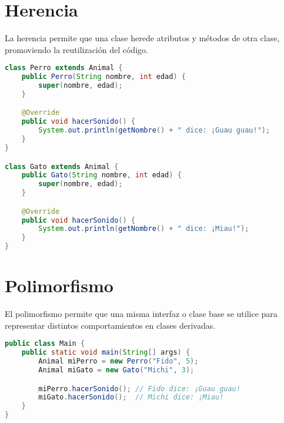 \documentclass[12pt]{article}
\begin{document}
\section{Herencia}
La herencia permite que una clase herede atributos y métodos de otra clase, promoviendo la reutilización del código.

\begin{lstlisting}[language=Java, caption={Ejemplo de herencia}]
class Perro extends Animal {
    public Perro(String nombre, int edad) {
        super(nombre, edad);
    }

    @Override
    public void hacerSonido() {
        System.out.println(getNombre() + " dice: ¡Guau guau!");
    }
}

class Gato extends Animal {
    public Gato(String nombre, int edad) {
        super(nombre, edad);
    }

    @Override
    public void hacerSonido() {
        System.out.println(getNombre() + " dice: ¡Miau!");
    }
}
\end{lstlisting}

\section{Polimorfismo}
El polimorfismo permite que una misma interfaz o clase base se utilice para representar distintos comportamientos en clases derivadas.

\begin{lstlisting}[language=Java, caption={Ejemplo de polimorfismo}]
public class Main {
    public static void main(String[] args) {
        Animal miPerro = new Perro("Fido", 5);
        Animal miGato = new Gato("Michi", 3);

        miPerro.hacerSonido(); // Fido dice: ¡Guau guau!
        miGato.hacerSonido();  // Michi dice: ¡Miau!
    }
}
\end{lstlisting}
\end{document}
